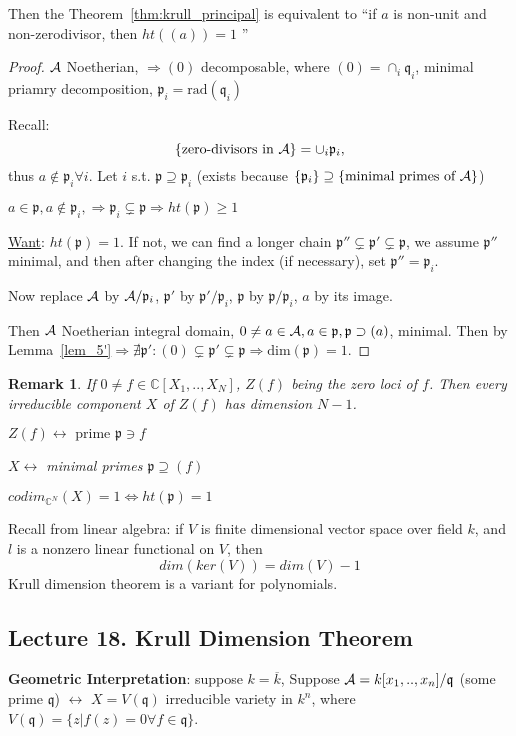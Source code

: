 \documentclass[11pt]{article}
\newtheorem{rmk}[thm]{Remark}
\newcommand{\cplx}{\mathbb C}
\newcommand{\scp}{{\mathfrak p}}
\newcommand{\scq}{\mathfrak q}
\newcommand{\cala}{{\cal A}}
\newcommand{\Lrta}{\Longrightarrow}
\newcommand{\llrta}{\longleftrightarrow}
\newcommand{\Llrta}{\Longleftrightarrow}
\begin{document}
Then the Theorem~\ref{thm:krull_principal} is equivalent to 
``if $a$ is non-unit and non-zerodivisor, then $ht((a))=1$ ''
\begin{proof}
$\cala$ Noetherian, $\Lrta (0)$ decomposable, where $(0)=\cap_i\scq_i$, minimal priamry decomposition, $\scp_i=\text{rad}(\scq_i)$

Recall:
$$
\{\text{zero-divisors in }\cala\} =\cup_i\scp_i,
$$
thus $a\notin\scp_i\forall i$. Let $i$ s.t. $\scp\supseteq \scp_i$ (exists because $\{\scp_i\}\supseteq \{\text{minimal primes of $\cala$}\}$)

$a\in\scp ,a\notin \scp_i,\Lrta\scp_i\subsetneq \scp\Lrta ht(\scp)\geq 1$

\underline{Want}: $ht(\scp)=1$. If not, we can find a longer chain $\scp''\subsetneq \scp'\subsetneq \scp$, we assume $\scp''$ minimal, and then after changing the index (if necessary), set $\scp''=\scp_i$.

Now replace
$\cala$ by $\cala/\scp_i$, $\scp'$ by $\scp'/\scp_i$, $\scp$ by $\scp/\scp_i$, $a$ by its image.

Then $\cala$ Noetherian integral domain, $0\neq a\in \cala,a\in\scp,\scp\supset(a)$, minimal.
Then by Lemma~\ref{lem_5'}$\Lrta \nexists \scp':(0)\subsetneq \scp'\subsetneq \scp\Lrta \text{dim}(\scp)=1$.
\end{proof}

\begin{rmk}
If $0\neq f\in\cplx[X_1,..,X_N]$, $Z(f)$ being the zero loci of $f$. Then every irreducible component $X$ of $Z(f)$ has dimension $N-1$.

$Z(f)\llrta\text{ prime }\scp\ni f$

$X\llrta $ minimal primes $\scp\supseteq (f)$ 

$codim_{\cplx^N}(X)=1\Llrta ht(\scp)=1$
\end{rmk}

Recall from linear algebra:
if $V$ is finite dimensional vector space over field $k$, and $l$ is a nonzero linear functional on $V$, then
$$
dim(ker(V))=dim(V)-1
$$
Krull dimension theorem is a variant for polynomials.



\subsection{Lecture 18. Krull Dimension Theorem}

\textbf{Geometric Interpretation}: suppose $k=\overline{k}$,
Suppose $\cala=k[x_1,..,x_n]/\scq$ (some prime $\scq$) $\llrta$ $X=V(\scq)$ irreducible variety in $k^n$, where $V(\scq)=\{z|f(z)=0\forall f\in\scq\}$.
\end{document}
